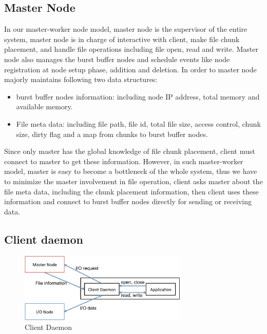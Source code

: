 \subsection{Master Node}
In our master-worker node model, master node is the supervisor of the entire system,
master node is in charge of interactive with client, make file chunk placement, and handle file operations including file open, read and write.
Master node also manages the burst buffer nodes and schedule events like node registration at node
setup phase, addition and deletion.
In order to master node majorly maintains following two data structures:
\begin{itemize}
  \item burst buffer nodes information: including node IP address, total memory and
  available memory. 
  \item File meta data: including file path, file id, total file size, access control, chunk size,
  dirty flag and a map from chunks to burst buffer nodes.
\end{itemize}

Since only master has the global knowledge of file chunk placement, client must connect to master
to get these information.
However, in such master-worker model, master is easy to become a bottleneck of the whole system,
thus we have to minimize the master involvement in file operation, client asks master about the
file meta data, including the chunk placement information, then client uses these information and
connect to burst buffer nodes directly for sending or receiving data.

\subsection{Client daemon}

\begin{figure}[tb]
	\centering
	\includegraphics[width=8cm]{img/client_daemon}
	\caption{Client Daemon}
	\label{implementaion:client_daemon}
\end{figure}

